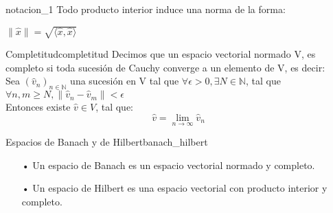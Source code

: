 \documentclass[12pt,a4paper]{book}
\providecommand{\norm}[1]{\lVert#1\rVert}
\providecommand{\inp}[1]{\langle#1\rangle}
\begin{document}
\smallskip

\begin{notacion}{}{notacion_1}
Todo producto interior induce una norma de la forma:
\begin{center}
$\norm{\widehat{x}}=\sqrt{\inp{\widehat{x},\widehat{x}}}$
\end{center}
\end{notacion}

\smallskip

\begin{definicion}{Completitud}{completitud}
Decimos que un espacio vectorial normado V, es completo si toda sucesión de Cauchy converge a un elemento de V, es decir:\\

Sea $(\widehat{v}_{n})_{n\in\mathbb{N}}$ una sucesión en V tal que $\forall\epsilon >0, \exists N\in\mathbb{N}$, tal que $\forall n,m\geq N, \norm{\widehat{v}_{n}-\widehat{v}_{m}}<\epsilon$\\

Entonces existe $\widehat{v} \in V$, tal que: $$\widehat{v}=\lim_{n\rightarrow\infty} \widehat{v}_{n}$$ 
\end{definicion}

\smallskip

\begin{definicion}{Espacios de Banach y de Hilbert}{banach_hilbert}
\begin{enumerate}
\item[•] Un espacio de Banach es un espacio vectorial normado y completo.
\item[•] Un espacio de Hilbert es una espacio vectorial con producto interior y completo.
\end{enumerate}
\end{definicion}

\smallskip
\end{document}
